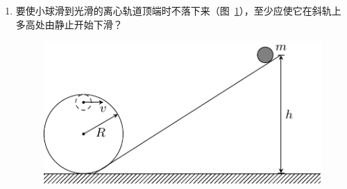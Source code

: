 \begin{enumerate}
\item 要使小球滑到光滑的离心轨道顶端时不落下来（图~\ref{fig_A_7-25}），至少应使它在斜轨上多高处由静止开始下滑？


\begin{figure}[htbp]
    \centering
    \includegraphics{fig/A/7-25.pdf}
    \caption{}\label{fig_A_7-25}
\end{figure}

\end{enumerate}




